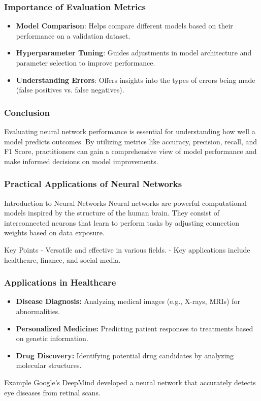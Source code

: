 \documentclass[aspectratio=169]{beamer}
\begin{document}
\begin{frame}[fragile]
    \frametitle{Importance of Evaluation Metrics}
    \begin{itemize}
        \item \textbf{Model Comparison}: Helps compare different models based on their performance on a validation dataset.
        \item \textbf{Hyperparameter Tuning}: Guides adjustments in model architecture and parameter selection to improve performance.
        \item \textbf{Understanding Errors}: Offers insights into the types of errors being made (false positives vs. false negatives).
    \end{itemize}
\end{frame}

\begin{frame}[fragile]
    \frametitle{Conclusion}
    Evaluating neural network performance is essential for understanding how well a model predicts outcomes. By utilizing metrics like accuracy, precision, recall, and F1 Score, practitioners can gain a comprehensive view of model performance and make informed decisions on model improvements.
\end{frame}

\begin{frame}[fragile]
    \frametitle{Practical Applications of Neural Networks}
    \begin{block}{Introduction to Neural Networks}
        Neural networks are powerful computational models inspired by the structure of the human brain. They consist of interconnected neurons that learn to perform tasks by adjusting connection weights based on data exposure.
    \end{block}
    \begin{block}{Key Points}
        - Versatile and effective in various fields.
        - Key applications include healthcare, finance, and social media.
    \end{block}
\end{frame}

\begin{frame}[fragile]
    \frametitle{Applications in Healthcare}
    \begin{itemize}
        \item \textbf{Disease Diagnosis:} Analyzing medical images (e.g., X-rays, MRIs) for abnormalities.
        \item \textbf{Personalized Medicine:} Predicting patient responses to treatments based on genetic information.
        \item \textbf{Drug Discovery:} Identifying potential drug candidates by analyzing molecular structures.
    \end{itemize}
    \begin{block}{Example}
        Google's DeepMind developed a neural network that accurately detects eye diseases from retinal scans.
    \end{block}
\end{frame}
\end{document}
